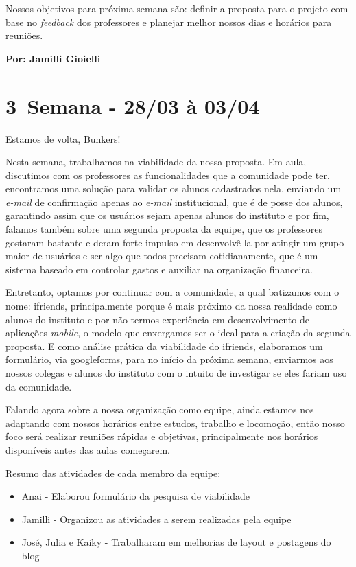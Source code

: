 Nossos objetivos para próxima semana são: definir a proposta para o projeto com base no \textsl{feedback} dos professores e planejar melhor nossos dias e horários para reuniões.

\textbf{Por:  Jamilli Gioielli} 

\section{3\textordfeminine \, Semana - 28/03 à 03/04}
Estamos de volta, Bunkers!

Nesta semana, trabalhamos na viabilidade da nossa proposta. Em aula, discutimos com os professores as funcionalidades que a comunidade pode ter, encontramos uma solução para validar os alunos cadastrados nela, enviando um \textsl{e-mail} de confirmação apenas ao \textsl{e-mail} institucional, que é de posse dos alunos, garantindo assim que os usuários sejam apenas alunos do instituto e por fim, falamos também sobre uma segunda proposta da equipe, que os professores gostaram bastante e deram forte impulso em desenvolvê-la por atingir um grupo maior de usuários e ser algo que todos precisam cotidianamente, que é um sistema baseado em controlar gastos e auxiliar na organização financeira.

Entretanto, optamos por continuar com a comunidade, a qual batizamos com o nome: \gls{ifriends}, principalmente porque é mais próximo da nossa realidade como alunos do instituto e por não termos experiência em desenvolvimento de aplicações \textsl{mobile}, o modelo que enxergamos ser o ideal para a criação da segunda proposta. E como análise prática da viabilidade do \gls{ifriends}, elaboramos um formulário, via \gls{googleforms}, para no início da próxima semana, enviarmos aos nossos colegas e alunos do instituto com o intuito de investigar se eles fariam uso da comunidade.

Falando agora sobre a nossa organização como equipe, ainda estamos nos adaptando com nossos horários entre estudos, trabalho e locomoção, então nosso foco será realizar reuniões rápidas e objetivas, principalmente nos horários disponíveis antes das aulas começarem.

Resumo das atividades de cada membro da equipe:

\begin{itemize}
    \item Anai - Elaborou formulário da pesquisa de viabilidade
    \item Jamilli - Organizou as atividades a serem realizadas pela equipe 
    \item José, Julia e Kaiky - Trabalharam em melhorias de layout e postagens do blog
\end{itemize}

